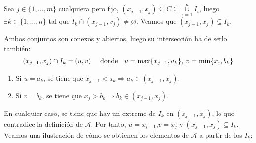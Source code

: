 \documentclass[12pt,a4paper]{article}
\newcommand{\smallcup}{\mathop{\cup}\limits}
\begin{document}
Sea $j \in \{1,\dots,m\}$ cualquiera pero fijo, $(x_{j-1}, x_j) \subseteq C \subseteq \smallcup_{i=1}^n I_i$, luego $\exists k \in \{1,\ldots,n\}$ tal que $I_k \cap (x_{j-1}, x_j) \neq \varnothing$. Veamos que $(x_{j-1}, x_j) \subseteq I_k$.

\noindent
Ambos conjuntos son conexos y abiertos, luego su intersección ha de serlo también:
\\[-4ex]
\begin{align*}
    (x_{j-1}, x_j) \cap I_k = (u,v) &&
    \text{ donde } \hspace{2mm} u = \max\{x_{j-1}, a_k\}, \hspace{1mm} v = \min\{x_j, b_k\}
\end{align*}
\begin{enumerate}
    \item Si $u = a_k$, se tiene que $x_{j-1} < a_k \Rightarrow a_k \in (x_{j-1}, x_j)$.
    \item Si $v = b_k$, se tiene que $x_j > b_k \Rightarrow b_k \in (x_{j-1}, x_j)$.
\end{enumerate}
En cualquier caso, se tiene que hay un extremo de $I_k$ en $(x_{j-1}, x_j)$, lo que contradice la definición de $\mathcal{A}$.
Por tanto, $u = x_{j-1}$,$v = x_j$ y $(x_{j-1}, x_j) \subseteq I_k$. Veamos una ilustración de cómo se obtienen los elementos de $\mathcal{A}$
a partir de los $I_k$:
\end{document}
